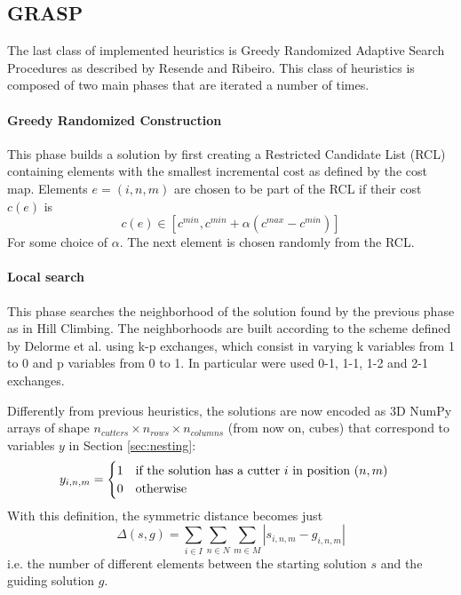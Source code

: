 \subsection{GRASP}
The last class of implemented heuristics is Greedy Randomized Adaptive Search Procedures as described by Resende and Ribeiro\cite{grasp}. This class of heuristics is composed of two main phases that are iterated a number of times.

\paragraph{Greedy Randomized Construction} This phase builds a solution by first creating a Restricted Candidate List (RCL) containing elements with the smallest incremental cost as defined by the cost map. Elements $e = (i, n, m)$ are chosen to be part of the RCL if their cost $c(e)$ is
$$
c(e) \in [c^{min}, c^{min} + \alpha (c^{max} - c^{min})]
$$ 
For some choice of $\alpha$. The next element is chosen randomly from the RCL.

\paragraph{Local search} This phase searches the neighborhood of the solution found by the previous phase as in Hill Climbing. The neighborhoods are built according to the scheme defined by Delorme et al.\cite{local_search} using k-p exchanges, which consist in varying k variables from 1 to 0 and p variables from 0 to 1. In particular were used 0-1, 1-1, 1-2 and 2-1 exchanges.

\vspace{20px}

Differently from previous heuristics, the solutions are now encoded as 3D NumPy arrays of shape $n_{cutters} \times n_{rows} \times n_{columns}$ (from now on, cubes) that correspond to variables $y$ in Section \ref{sec:nesting}:
\begin{equation}\notag
	y_{i, n, m} = 
	\begin{cases}
		1 \quad \textrm{if the solution has a cutter } i \textrm{ in position } (n, m) \\
		0 \quad \textrm{otherwise}
	\end{cases}
\end{equation}
With this definition, the symmetric distance becomes just
$$
\Delta(s, g) = \sum_{i \in I}\sum_{n \in N}\sum_{m \in M} |s_{i, n, m} - g_{i, n, m}|
$$
i.e. the number of different elements between the starting solution $s$ and the guiding solution $g$.


